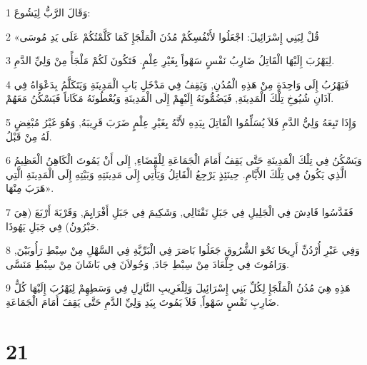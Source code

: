 \par 1 وَقَالَ الرَّبُّ لِيَشُوعَ:
\par 2 «قُلْ لِبَنِي إِسْرَائِيلَ: اجْعَلُوا لأَنْفُسِكُمْ مُدُنَ الْمَلْجَإِ كَمَا كَلَّمْتُكُمْ عَلَى يَدِ مُوسَى
\par 3 لِيَهْرُبَ إِلَيْهَا الْقَاتِلُ ضَارِبُ نَفْسٍ سَهْواً بِغَيْرِ عِلْمٍ. فَتَكُونَ لَكُمْ مَلْجَأً مِنْ وَلِيِّ الدَّمِ.
\par 4 فَيَهْرُبُ إِلَى وَاحِدَةٍ مِنْ هَذِهِ الْمُدُنِ, وَيَقِفُ فِي مَدْخَلِ بَابِ الْمَدِينَةِ وَيَتَكَلَّمُ بِدَعْوَاهُ فِي آذَانِ شُيُوخِ تِلْكَ الْمَدِينَةِ, فَيَضُمُّونَهُ إِلَيْهِمْ إِلَى الْمَدِينَةِ وَيُعْطُونَهُ مَكَاناً فَيَسْكُنُ مَعَهُمْ.
\par 5 وَإِذَا تَبِعَهُ وَلِيُّ الدَّمِ فَلاَ يُسَلِّمُوا الْقَاتِلَ بِيَدِهِ لأَنَّهُ بِغَيْرِ عِلْمٍ ضَرَبَ قَرِيبَهُ, وَهُوَ غَيْرُ مُبْغِضٍ لَهُ مِنْ قَبْلُ.
\par 6 وَيَسْكُنُ فِي تِلْكَ الْمَدِينَةِ حَتَّى يَقِفُ أَمَامَ الْجَمَاعَةِ لِلْقَضَاءِ, إِلَى أَنْ يَمُوتَ الْكَاهِنُ الْعَظِيمُ الَّذِي يَكُونُ فِي تِلْكَ الأَيَّامِ. حِينَئِذٍ يَرْجِعُ الْقَاتِلُ وَيَأْتِي إِلَى مَدِينَتِهِ وَبَيْتِهِ إِلَى الْمَدِينَةِ الَّتِي هَرَبَ مِنْهَا».
\par 7 فَقَدَّسُوا قَادِشَ فِي الْجَلِيلِ فِي جَبَلِ نَفْتَالِي, وَشَكِيمَ فِي جَبَلِ أَفْرَايِمَ, وَقَرْيَةَ أَرْبَعَ (هِيَ حَبْرُونُ) فِي جَبَلِ يَهُوذَا.
\par 8 وَفِي عَبْرِ أُرْدُنِّ أَرِيحَا نَحْوَ الشُّرُوقِ جَعَلُوا بَاصَرَ فِي الْبَرِّيَّةِ فِي السَّهْلِ مِنْ سِبْطِ رَأُوبَيْنَ, وَرَامُوتَ فِي جِلْعَادَ مِنْ سِبْطِ جَادَ, وَجُولاَنَ فِي بَاشَانَ مِنْ سِبْطِ مَنَسَّى.
\par 9 هَذِهِ هِيَ مُدُنُ الْمَلْجَإِ لِكُلِّ بَنِي إِسْرَائِيلَ وَلِلْغَرِيبِ النَّازِلِ فِي وَسَطِهِمْ لِيَهْرُبَ إِلَيْهَا كُلُّ ضَارِبِ نَفْسٍ سَهْواً, فَلاَ يَمُوتَ بِيَدِ وَلِيِّ الدَّمِ حَتَّى يَقِفَ أَمَامَ الْجَمَاعَةِ.

\chapter{21}

